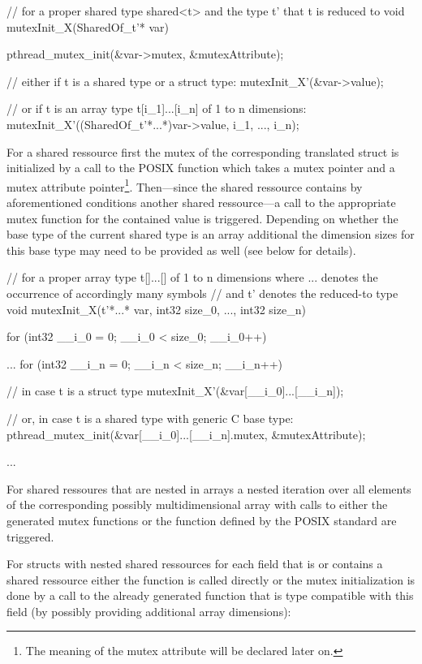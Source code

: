 \begin{ccode}
// for a proper shared type shared<t> and the type t' that t is reduced to
void mutexInit_X(SharedOf_t'* var) { 
  pthread_mutex_init(&var->mutex, &mutexAttribute);
  
  // either if t is a shared type or a struct type:
  mutexInit_X'(&var->value); 
  
  // or if t is an array type t[i_1]...[i_n] of 1 to n dimensions:
  mutexInit_X'((SharedOf_t'*...*)var->value, i_1, ..., i_n); 
}
\end{ccode}
For a shared ressource first the mutex of the corresponding translated struct is initialized by a call to the POSIX function  which takes a mutex pointer and a mutex attribute pointer\footnote{The meaning of the mutex attribute will be declared later on.}. Then---since the shared ressource contains by aforementioned conditions another shared ressource---a call to the appropriate mutex function for the contained value is triggered. Depending on whether the base type of the current shared type is an array additional the dimension sizes for this base type may need to be provided as well (see below for details).

\begin{ccode}
// for a proper array type t[]...[] of 1 to n dimensions where ... denotes the occurrence of accordingly many symbols 
// and t' denotes the reduced-to type
void mutexInit_X(t'*...* var, int32 size_0, ..., int32 size_n) { 
  for (int32 __i_0 = 0; __i_0 < size_0; __i_0++) { 
    ...
      for (int32 __i_n = 0; __i_n < size_n; __i_n++) {
        // in case t is a struct type
        mutexInit_X'(&var[__i_0]...[__i_n]);
        
        // or, in case t is a shared type with generic C base type:
        pthread_mutex_init(&var[__i_0]...[__i_n].mutex, &mutexAttribute);
      }
    ...
  } 
}
\end{ccode}
For shared ressoures that are nested in arrays a nested iteration over all elements of the corresponding possibly multidimensional array with calls to either the generated mutex functions or the function defined by the POSIX standard are triggered.

For structs with nested shared ressources for each field that is or contains a shared ressource either the  function is called directly or the mutex initialization is done by a call to the already generated function that is type compatible with this field (by possibly providing additional array dimensions):

